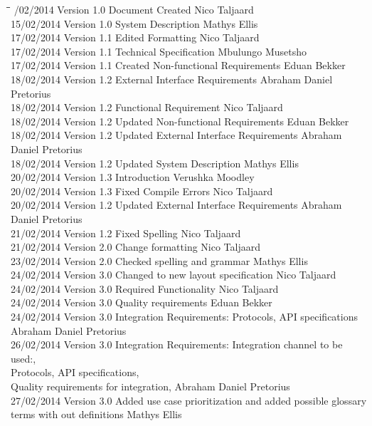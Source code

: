 \documentclass[12pt]{article}
\begin{document}
		\begin{tabbing}
			\hspace*{2.5cm}\=\hspace*{2.5cm}\=\hspace*{8cm}\=\hspace*{3cm} /02/2014 \> Version 1.0 \> Document Created \> Nico Taljaard \\
			15/02/2014 \> Version 1.0 \> System Description \> Mathys Ellis \\
			17/02/2014 \> Version 1.1 \> Edited Formatting \> Nico Taljaard \\
			17/02/2014 \> Version 1.1 \> Technical Specification \> Mbulungo Musetsho \\
			17/02/2014 \> Version 1.1 \> Created Non-functional Requirements \> Eduan Bekker \\
			18/02/2014 \> Version 1.2 \> External Interface Requirements \> Abraham Daniel Pretorius  \\
			18/02/2014 \> Version 1.2 \> Functional Requirement \> Nico Taljaard \\
			18/02/2014 \> Version 1.2 \> Updated Non-functional Requirements \> Eduan Bekker \\
			18/02/2014 \> Version 1.2 \> Updated External Interface Requirements \> Abraham Daniel Pretorius  \\
			18/02/2014 \> Version 1.2 \> Updated System Description \> Mathys Ellis \\
			20/02/2014 \> Version 1.3 \> Introduction \> Verushka Moodley \\
			20/02/2014 \> Version 1.3 \> Fixed Compile Errors \> Nico Taljaard \\
			20/02/2014 \> Version 1.2 \> Updated External Interface Requirements \> Abraham Daniel Pretorius  \\
			21/02/2014 \> Version 1.2 \> Fixed Spelling \> Nico Taljaard \\
			21/02/2014 \> Version 2.0 \> Change formatting \> Nico Taljaard \\
			23/02/2014 \> Version 2.0 \> Checked spelling and grammar \> Mathys Ellis \\
			24/02/2014 \> Version 3.0 \> Changed to new layout specification \> Nico Taljaard \\
			24/02/2014 \> Version 3.0 \> Required Functionality \> Nico Taljaard \\	
			24/02/2014 \> Version 3.0 \> Quality requirements \> Eduan Bekker \\
			24/02/2014 \> Version 3.0 \> Integration Requirements: Protocols, API specifications  \> Abraham Daniel Pretorius \\	
			26/02/2014 \> Version 3.0 \> Integration Requirements: Integration channel to be used:, \\
			Protocols, API specifications, \\ 
			Quality requirements for integration,
			  \> Abraham Daniel Pretorius \\
			27/02/2014 \> Version 3.0 \> Added use case prioritization and added possible glossary terms with out definitions  \> Mathys Ellis \\
		\end{tabbing}
\end{document}
